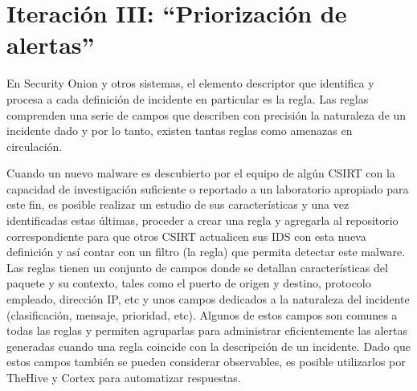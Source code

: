 \chapter{Iteración III: “Priorización de alertas”}
    En Security Onion y otros sistemas, el elemento descriptor que identifica y procesa a cada definición de incidente en particular es la regla. Las reglas comprenden una serie de campos que describen con precisión la naturaleza de un incidente dado y por lo tanto, existen tantas reglas como amenazas en circulación. \par
    Cuando un nuevo malware es descubierto por el equipo de algún CSIRT con la capacidad de investigación suficiente o reportado a un laboratorio apropiado para este fin, es posible realizar un estudio de sus características y una vez identificadas estas últimas, proceder a crear una regla y agregarla al repositorio correspondiente para que otros CSIRT actualicen sus IDS con esta nueva definición y así contar con un filtro (la regla) que permita detectar este malware. Las reglas tienen un conjunto de campos donde se detallan características del paquete y su contexto, tales como el puerto de origen y destino, protocolo empleado, dirección IP, etc y unos campos dedicados a la naturaleza del incidente (clasificación, mensaje, prioridad, etc). Algunos de estos campos son comunes a todas las reglas y permiten agruparlas para administrar eficientemente las alertas generadas cuando una regla coincide con la descripción de un incidente. Dado que estos campos también se pueden considerar observables, es posible utilizarlos por TheHive y Cortex para automatizar respuestas. \par

